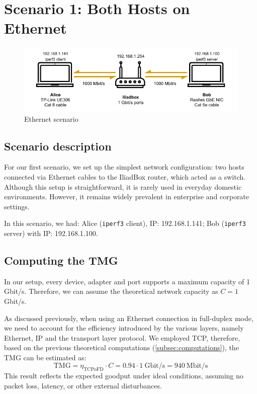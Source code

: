 \section{Scenario 1: Both Hosts on Ethernet}
\label{sec:wifi_water}
\begin{figure}[H]
    \includegraphics[width=0.90\linewidth]{images/wifi.drawio-4.pdf}
    \caption{Ethernet scenario}
    \label{fig:eth_to_eth_pic}
\end{figure}

\subsection{Scenario description}
For our first scenario, we set up the simplest network configuration: two hosts connected via Ethernet cables to the IliadBox router, which acted as a switch. Although this setup is straightforward, it is rarely used in everyday domestic environments. However, it remains widely prevalent in enterprise and corporate settings.

In this scenario, we had: Alice (\texttt{iperf3} client), IP: 192.168.1.141; Bob (\texttt{iperf3} server) with IP: 192.168.1.100.

\subsection{Computing the TMG}
In our setup, every device, adapter and port supports a maximum capacity of 1 Gbit/s. Therefore, we can assume the theoretical network capacity as $C = 1$ Gbit/s.

As discussed previously, when using an Ethernet connection in full-duplex mode, we need to account for the efficiency introduced by the various layers, namely Ethernet, IP and the transport layer protocol. We employed TCP, therefore, based on the previous theoretical computations (\ref{subsec:computations}), the TMG can be estimated as:
$$
\text{TMG} = \eta_{\text{TCPoFD}} \cdot C = 0.94 \cdot 1 \ \text{Gbit/s} = 940 \ \text{Mbit/s}
$$
This result reflects the expected goodput under ideal conditions, assuming no packet loss, latency, or other external disturbances. 
